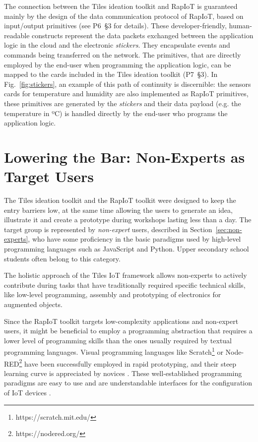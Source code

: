 The connection between the Tiles ideation toolkit and RapIoT is guaranteed mainly by the design of the data communication protocol of RapIoT, based on input/output primitives (see P6~\S3 for details). These developer-friendly, human-readable constructs represent the data packets exchanged between the application logic in the cloud and the electronic \textit{stickers}. They encapsulate events and commands being transferred on the network. The primitives, that are directly employed by the end-user when programming the application logic, can be mapped to the cards included in the Tiles ideation toolkit (P7~\S3). In Fig.~\ref{fig:stickers}, an example of this path of continuity is discernible: the sensors cards for temperature and humidity are also implemented as RapIoT primitives, these primitives are generated by the \textit{stickers} and their data payload (e.g. the temperature in ºC) is handled directly by the end-user who programs the application logic.


\section{Lowering the Bar: Non-Experts as Target Users}
\label{sec:non-experts-target}

The Tiles ideation toolkit and the RapIoT toolkit were designed to keep the entry barriers low, at the same time allowing the users to generate an idea, illustrate it and create a prototype during workshops lasting less than a day.
The target group is represented by \textit{non-expert} users, described in Section~\ref{sec:non-experts}, who have some proficiency in the basic paradigms used by high-level programming languages such as JavaScript and Python. Upper secondary school students often belong to this category.

The holistic approach of the Tiles IoT framework allows non-experts to actively contribute during tasks that have traditionally required specific technical skills, like low-level programming, assembly and prototyping of electronics for augmented objects.

Since the RapIoT toolkit targets low-complexity applications and non-expert users, it might be beneficial to employ a programming abstraction that requires a lower level of programming skills than the ones usually required by textual programming languages. Visual programming languages like Scratch\footnote{https://scratch.mit.edu/} or Node-RED\footnote{https://nodered.org/} have been successfully employed in rapid prototyping, and their steep learning curve is appreciated by novices \autocite{booth_end-user_2013}. These well-established programming paradigms are easy to use and are understandable interfaces for the configuration of IoT devices \autocite{houben_physikit_2016}.


